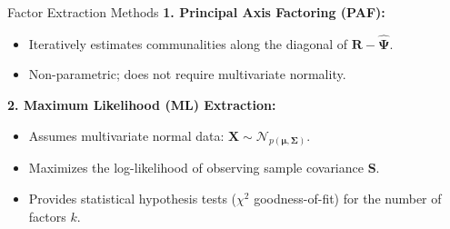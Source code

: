 \documentclass[aspectratio=169,ignorenonframetext]{beamer}
\begin{document}
\begin{frame}{Factor Extraction Methods}
\textbf{1. Principal Axis Factoring (PAF):}

\begin{itemize}
\item
  Iteratively estimates communalities along the diagonal of
  \(\mathbf{R} - \hat{\mathbf{\Psi}}\).
\item
  Non-parametric; does not require multivariate normality.
\end{itemize}

\textbf{2. Maximum Likelihood (ML) Extraction:}

\begin{itemize}
\item
  Assumes multivariate normal data:
  \(\mathbf{X} \sim \mathcal{N}_{p\left( \mathbf{\mu},\mathbf{\Sigma} \right)}\).
\item
  Maximizes the log-likelihood of observing sample covariance
  \(\mathbf{S}\).
\item
  Provides statistical hypothesis tests (\(\chi^{2}\) goodness-of-fit)
  for the number of factors \(k\).
\end{itemize}
\end{frame}
\end{document}
